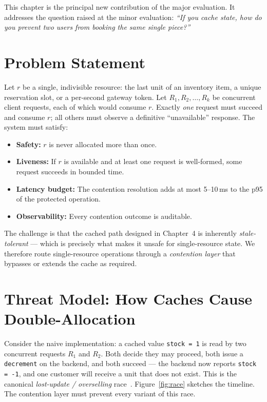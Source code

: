 
This chapter is the principal new contribution of the major evaluation. It addresses the question raised at the minor evaluation: \emph{``If you cache state, how do you prevent two users from booking the same single piece?''}

\section{Problem Statement}
Let $r$ be a single, indivisible resource: the last unit of an inventory item, a unique reservation slot, or a per-second gateway token. Let $R_1, R_2, \ldots, R_k$ be concurrent client requests, each of which would consume $r$. Exactly \emph{one} request must succeed and consume $r$; all others must observe a definitive ``unavailable'' response. The system must satisfy:
\begin{itemize}[leftmargin=*]
    \item \textbf{Safety:} $r$ is never allocated more than once.
    \item \textbf{Liveness:} If $r$ is available and at least one request is well-formed, some request succeeds in bounded time.
    \item \textbf{Latency budget:} The contention resolution adds at most 5--10\,ms to the p95 of the protected operation.
    \item \textbf{Observability:} Every contention outcome is auditable.
\end{itemize}

The challenge is that the cached path designed in Chapter~4 is inherently \emph{stale-tolerant} --- which is precisely what makes it unsafe for single-resource state. We therefore route single-resource operations through a \emph{contention layer} that bypasses or extends the cache as required.

\section{Threat Model: How Caches Cause Double-Allocation}
Consider the naive implementation: a cached value \texttt{stock = 1} is read by two concurrent requests $R_1$ and $R_2$. Both decide they may proceed, both issue a \texttt{decrement} on the backend, and both succeed --- the backend now reports \texttt{stock = -1}, and one customer will receive a unit that does not exist. This is the canonical \emph{lost-update / overselling} race~\cite{oneuptime2026inventory, amitavroy2026hotel}. Figure~\ref{fig:race} sketches the timeline. The contention layer must prevent every variant of this race.

